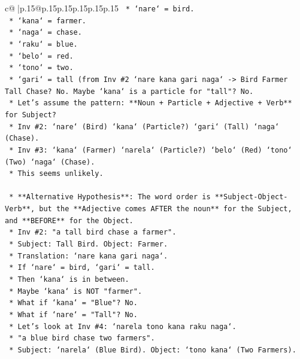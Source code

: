 \documentclass{article}
\begin{document}
{\begin{supertabular}{c@{$\;$}|p{.15\linewidth}@{}p{.15\linewidth}p{.15\linewidth}p{.15\linewidth}p{.15\linewidth}p{.15\linewidth}}
{{{\texttt{        *   `nare` = bird.} \\
\texttt{        *   `kana` = farmer.} \\
\texttt{        *   `naga` = chase.} \\
\texttt{        *   `raku` = blue.} \\
\texttt{        *   `belo` = red.} \\
\texttt{        *   `tono` = two.} \\
\texttt{        *   `gari` = tall (from Inv \#2 `nare kana gari naga` {-}> Bird Farmer Tall Chase? No. Maybe `kana` is a particle for "tall"? No.} \\
\texttt{        *   Let's assume the pattern: **Noun + Particle + Adjective + Verb** for Subject?} \\
\texttt{        *   Inv \#2: `nare` (Bird) `kana` (Particle?) `gari` (Tall) `naga` (Chase).} \\
\texttt{        *   Inv \#3: `kana` (Farmer) `narela` (Particle?) `belo` (Red) `tono` (Two) `naga` (Chase).} \\
\texttt{        *   This seems unlikely.} \\
\\ 
\texttt{    *   **Alternative Hypothesis**: The word order is **Subject{-}Object{-}Verb**, but the **Adjective comes AFTER the noun** for the Subject, and **BEFORE** for the Object.} \\
\texttt{        *   Inv \#2: "a tall bird chase a farmer".} \\
\texttt{            *   Subject: Tall Bird. Object: Farmer.} \\
\texttt{            *   Translation: `nare kana gari naga`.} \\
\texttt{            *   If `nare` = bird, `gari` = tall.} \\
\texttt{            *   Then `kana` is in between.} \\
\texttt{            *   Maybe `kana` is NOT "farmer".} \\
\texttt{            *   What if `kana` = "Blue"? No.} \\
\texttt{            *   What if `nare` = "Tall"? No.} \\
\texttt{            *   Let's look at Inv \#4: `narela tono kana raku naga`.} \\
\texttt{            *   "a blue bird chase two farmers".} \\
\texttt{            *   Subject: `narela` (Blue Bird). Object: `tono kana` (Two Farmers).} \\
}}}
\end{supertabular}}
\end{document}
